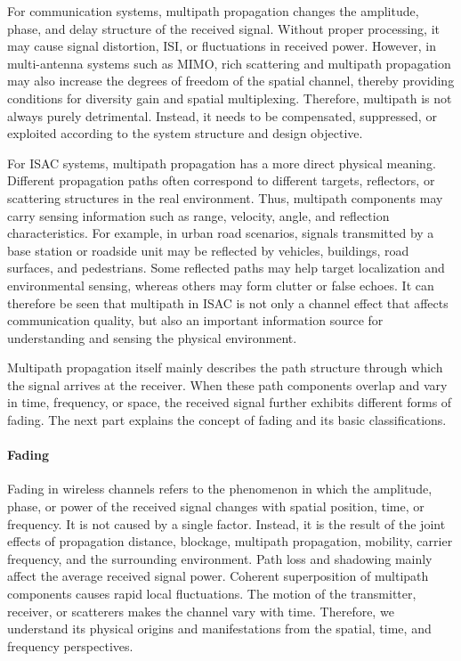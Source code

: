 For communication systems,
multipath propagation changes the amplitude,
phase,
and delay structure of the received signal.
Without proper processing,
it may cause signal distortion,
ISI,
or fluctuations in received power.
However,
in multi-antenna systems such as MIMO,
rich scattering and multipath propagation may also increase the degrees of freedom of the spatial channel,
thereby providing conditions for diversity gain and spatial multiplexing.
Therefore,
multipath is not always purely detrimental.
Instead,
it needs to be compensated,
suppressed,
or exploited according to the system structure and design objective.

For ISAC systems,
multipath propagation has a more direct physical meaning.
Different propagation paths often correspond to different targets,
reflectors,
or scattering structures in the real environment.
Thus,
multipath components may carry sensing information such as range,
velocity,
angle,
and reflection characteristics.
For example,
in urban road scenarios,
signals transmitted by a base station or roadside unit may be reflected by vehicles,
buildings,
road surfaces,
and pedestrians.
Some reflected paths may help target localization and environmental sensing,
whereas others may form clutter or false echoes.
It can therefore be seen that multipath in ISAC is not only a channel effect that affects communication quality,
but also an important information source for understanding and sensing the physical environment.

Multipath propagation itself mainly describes the path structure through which the signal arrives at the receiver.
When these path components overlap and vary in time,
frequency,
or space,
the received signal further exhibits different forms of fading.
The next part explains the concept of fading and its basic classifications.


\paragraph{Fading}

Fading in wireless channels refers to the phenomenon in which the amplitude,
phase,
or power of the received signal changes with spatial position,
time,
or frequency.
It is not caused by a single factor.
Instead,
it is the result of the joint effects of propagation distance,
blockage,
multipath propagation,
mobility,
carrier frequency,
and the surrounding environment.
Path loss and shadowing mainly affect the average received signal power.
Coherent superposition of multipath components causes rapid local fluctuations.
The motion of the transmitter,
receiver,
or scatterers makes the channel vary with time.
Therefore,
we understand its physical origins and manifestations from the spatial,
time,
and frequency perspectives.


